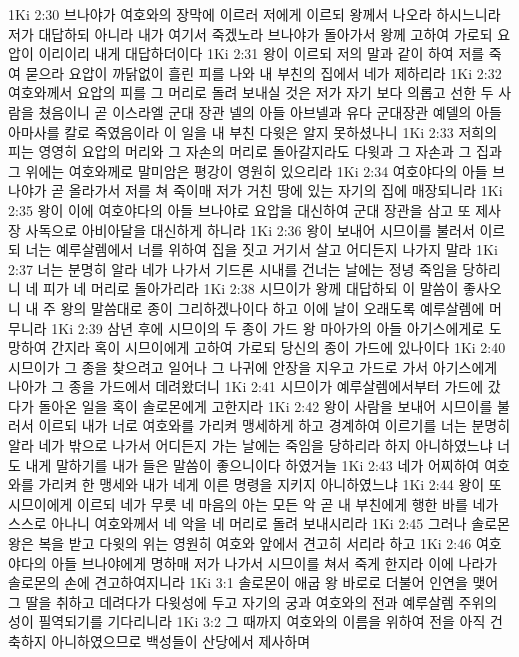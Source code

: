 1Ki 2:30  브나야가 여호와의 장막에 이르러 저에게 이르되 왕께서 나오라 하시느니라 저가 대답하되 아니라 내가 여기서 죽겠노라 브나야가 돌아가서 왕께 고하여 가로되 요압이 이리이리 내게 대답하더이다
1Ki 2:31  왕이 이르되 저의 말과 같이 하여 저를 죽여 묻으라 요압이 까닭없이 흘린 피를 나와 내 부친의 집에서 네가 제하리라
1Ki 2:32  여호와께서 요압의 피를 그 머리로 돌려 보내실 것은 저가 자기 보다 의롭고 선한 두 사람을 쳤음이니 곧 이스라엘 군대 장관 넬의 아들 아브넬과 유다 군대장관 예델의 아들 아마사를 칼로 죽였음이라 이 일을 내 부친 다윗은 알지 못하셨나니
1Ki 2:33  저희의 피는 영영히 요압의 머리와 그 자손의 머리로 돌아갈지라도 다윗과 그 자손과 그 집과 그 위에는 여호와께로 말미암은 평강이 영원히 있으리라
1Ki 2:34  여호야다의 아들 브나야가 곧 올라가서 저를 쳐 죽이매 저가 거친 땅에 있는 자기의 집에 매장되니라
1Ki 2:35  왕이 이에 여호야다의 아들 브나야로 요압을 대신하여 군대 장관을 삼고 또 제사장 사독으로 아비아달을 대신하게 하니라
1Ki 2:36  왕이 보내어 시므이를 불러서 이르되 너는 예루살렘에서 너를 위하여 집을 짓고 거기서 살고 어디든지 나가지 말라
1Ki 2:37  너는 분명히 알라 네가 나가서 기드론 시내를 건너는 날에는 정녕 죽임을 당하리니 네 피가 네 머리로 돌아가리라
1Ki 2:38  시므이가 왕께 대답하되 이 말씀이 좋사오니 내 주 왕의 말씀대로 종이 그리하겠나이다 하고 이에 날이 오래도록 예루살렘에 머무니라
1Ki 2:39  삼년 후에 시므이의 두 종이 가드 왕 마아가의 아들 아기스에게로 도망하여 간지라 혹이 시므이에게 고하여 가로되 당신의 종이 가드에 있나이다
1Ki 2:40  시므이가 그 종을 찾으려고 일어나 그 나귀에 안장을 지우고 가드로 가서 아기스에게 나아가 그 종을 가드에서 데려왔더니
1Ki 2:41  시므이가 예루살렘에서부터 가드에 갔다가 돌아온 일을 혹이 솔로몬에게 고한지라
1Ki 2:42  왕이 사람을 보내어 시므이를 불러서 이르되 내가 너로 여호와를 가리켜 맹세하게 하고 경계하여 이르기를 너는 분명히 알라 네가 밖으로 나가서 어디든지 가는 날에는 죽임을 당하리라 하지 아니하였느냐 너도 내게 말하기를 내가 들은 말씀이 좋으니이다 하였거늘
1Ki 2:43  네가 어찌하여 여호와를 가리켜 한 맹세와 내가 네게 이른 명령을 지키지 아니하였느냐
1Ki 2:44  왕이 또 시므이에게 이르되 네가 무릇 네 마음의 아는 모든 악 곧 내 부친에게 행한 바를 네가 스스로 아나니 여호와께서 네 악을 네 머리로 돌려 보내시리라
1Ki 2:45  그러나 솔로몬왕은 복을 받고 다윗의 위는 영원히 여호와 앞에서 견고히 서리라 하고
1Ki 2:46  여호야다의 아들 브나야에게 명하매 저가 나가서 시므이를 쳐서 죽게 한지라 이에 나라가 솔로몬의 손에 견고하여지니라
1Ki 3:1  솔로몬이 애굽 왕 바로로 더불어 인연을 맺어 그 딸을 취하고 데려다가 다윗성에 두고 자기의 궁과 여호와의 전과 예루살렘 주위의 성이 필역되기를 기다리니라
1Ki 3:2  그 때까지 여호와의 이름을 위하여 전을 아직 건축하지 아니하였으므로 백성들이 산당에서 제사하며
